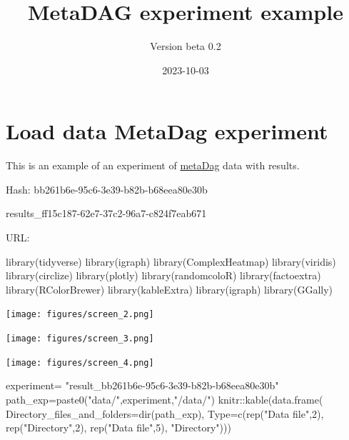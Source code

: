 \documentclass[
  letterpaper,
  DIV=11,
  numbers=noendperiod]{scrreprt}
\title{MetaDAG experiment example}
\author{Version beta 0.2}
\date{2023-10-03}
\newenvironment{Shaded}{}{}
\newcommand{\AttributeTok}[1]{\textcolor[rgb]{0.78,0.47,0.87}{#1}}
\newcommand{\DecValTok}[1]{\textcolor[rgb]{0.82,0.60,0.40}{#1}}
\newcommand{\FunctionTok}[1]{\textcolor[rgb]{0.38,0.69,0.94}{#1}}
\newcommand{\NormalTok}[1]{\textcolor[rgb]{0.67,0.70,0.75}{#1}}
\newcommand{\OtherTok}[1]{\textcolor[rgb]{0.15,0.68,0.38}{#1}}
\newcommand{\SpecialCharTok}[1]{\textcolor[rgb]{0.34,0.71,0.76}{#1}}
\newcommand{\StringTok}[1]{\textcolor[rgb]{0.60,0.76,0.47}{#1}}
\renewcommand*\contentsname{Table of contents}
\newcommand\contentsname{Table of contents}
\begin{document}
\maketitle
\renewcommand*\contentsname{Table of contents}
{
\hypersetup{linkcolor=blue}
\setcounter{tocdepth}{2}
\tableofcontents
}

\hypertarget{load-data-metadag-experiment}{%
\chapter{Load data MetaDag
experiment}\label{load-data-metadag-experiment}}

This is an example of an experiment of
\href{https://http://bioinfo.uib.es/metadag/}{metaDag} data with
results.

Hash: bb261b6e-95c6-3e39-b82b-b68eea80e30b

results\_ff15c187-62e7-37c2-96a7-c824f7eab671

URL:
\href{http://bioinfo.uib.es/metadag//handleExperiment/bb261b6e-95c6-3e39-b82b-b68eea80e30b}{}

\begin{Shaded}
\begin{Highlighting}[]
\FunctionTok{library}\NormalTok{(tidyverse)}
\FunctionTok{library}\NormalTok{(igraph)}
\FunctionTok{library}\NormalTok{(ComplexHeatmap)}
\FunctionTok{library}\NormalTok{(viridis)}
\FunctionTok{library}\NormalTok{(circlize)}
\FunctionTok{library}\NormalTok{(plotly)}
\FunctionTok{library}\NormalTok{(randomcoloR)}
\FunctionTok{library}\NormalTok{(factoextra)}
\FunctionTok{library}\NormalTok{(RColorBrewer)}
\FunctionTok{library}\NormalTok{(kableExtra)}
\FunctionTok{library}\NormalTok{(igraph)}
\FunctionTok{library}\NormalTok{(GGally)}
\end{Highlighting}
\end{Shaded}

\texttt{[image: figures/screen\_2.png]}

\texttt{[image: figures/screen\_3.png]}

\texttt{[image: figures/screen\_4.png]}

\begin{Shaded}
\begin{Highlighting}[]
\NormalTok{experiment}\OtherTok{=}
  \StringTok{"result\_bb261b6e{-}95c6{-}3e39{-}b82b{-}b68eea80e30b"}
\NormalTok{path\_exp}\OtherTok{=}\FunctionTok{paste0}\NormalTok{(}\StringTok{"data/"}\NormalTok{,experiment,}\StringTok{"/data/"}\NormalTok{)}
\NormalTok{knitr}\SpecialCharTok{::}\FunctionTok{kable}\NormalTok{(}\FunctionTok{data.frame}\NormalTok{(}
  \AttributeTok{Directory\_files\_and\_folders=}\FunctionTok{dir}\NormalTok{(path\_exp),}
  \AttributeTok{Type=}\FunctionTok{c}\NormalTok{(}\FunctionTok{rep}\NormalTok{(}\StringTok{"Data file"}\NormalTok{,}\DecValTok{2}\NormalTok{),}
  \FunctionTok{rep}\NormalTok{(}\StringTok{"Directory"}\NormalTok{,}\DecValTok{2}\NormalTok{),}
  \FunctionTok{rep}\NormalTok{(}\StringTok{"Data file"}\NormalTok{,}\DecValTok{5}\NormalTok{),}
  \StringTok{"Directory"}\NormalTok{)))}
\end{Highlighting}
\end{Shaded}
\end{document}
